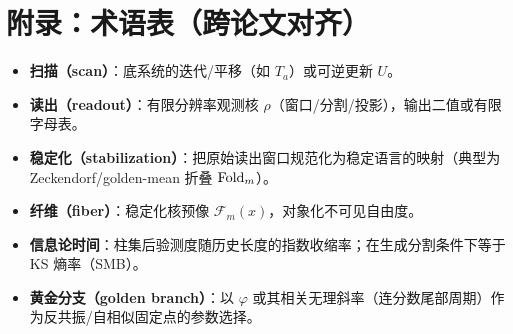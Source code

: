 \section{附录：术语表（跨论文对齐）}

\begin{itemize}
  \item \textbf{扫描（scan）}：底系统的迭代/平移（如 $T_a$）或可逆更新 $U$。
  \item \textbf{读出（readout）}：有限分辨率观测核 $\rho$（窗口/分割/投影），输出二值或有限字母表。
  \item \textbf{稳定化（stabilization）}：把原始读出窗口规范化为稳定语言的映射（典型为 Zeckendorf/golden-mean 折叠 $\mathrm{Fold}_m$）。
  \item \textbf{纤维（fiber）}：稳定化核预像 $\mathcal{F}_m(x)$，对象化不可见自由度。
  \item \textbf{信息论时间}：柱集后验测度随历史长度的指数收缩率；在生成分割条件下等于 KS 熵率（SMB）。
  \item \textbf{黄金分支（golden branch）}：以 $\varphi$ 或其相关无理斜率（连分数尾部周期）作为反共振/自相似固定点的参数选择。
\end{itemize}


